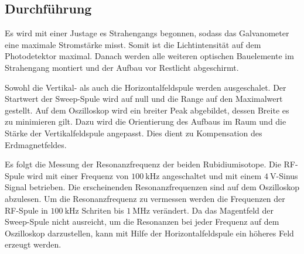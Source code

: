 \subsection{Durchführung}
Es wird mit einer Justage es Strahengangs begonnen, sodass das 
Galvanometer eine maximale Stromstärke misst. Somit ist die 
Lichtintensität auf dem Photodetektor maximal. Danach werden 
alle weiteren optischen Bauelemente im Strahengang montiert und der 
Aufbau vor Restlicht abgeschirmt.

\noindent
Sowohl die Vertikal- als auch die Horizontalfeldspule werden 
ausgeschalet. Der Startwert der Sweep-Spule wird auf null und die 
Range auf den Maximalwert gestellt. Auf dem Oszilloskop wird ein 
breiter Peak abgebildet, dessen Breite es zu minimieren gilt. Dazu 
wird die Orientierung des Aufbaus im Raum und die Stärke der 
Vertikalfeldspule angepasst. Dies dient zu Kompensation des 
Erdmagnetfeldes. 

\noindent
Es folgt die Messung der Resonanzfrequenz der beiden Rubidiumisotope.
Die RF-Spule wird mit einer Frequenz von $\SI{100}{\kilo\hertz}$
angeschaltet und mit einem $\SI{4}{\volt}$-Sinus Signal betrieben. 
Die erscheinenden Resonanzfrequenzen sind auf dem Oszilloskop abzulesen. 
Um die Resonanzfrequenz zu vermessen werden die Frequenzen der RF-Spule
in $\SI{100}{\kilo\hertz}$ Schriten bis $\SI{1}{\mega\hertz}$ verändert.
Da das Magentfeld der Sweep-Spule nicht ausreicht, um die Resonanzen
bei jeder Frequenz auf dem Oszilloskop darzustellen, kann mit Hilfe 
der Horizontalfeldspule ein höheres Feld erzeugt werden.